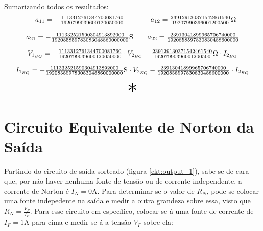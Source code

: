 \documentclass{report}
\let\oldsection\section
\renewcommand\section{\clearpage\oldsection}
\begin{document}
Sumarizando todos os resultados:
\begin{equation}
  \label{eq:params_a_calc}
  \centering
  \begin{matrix}
    a_{11} = - \frac{1113312761344700081760}{1920799039600120050000} & \hspace{10pt} a_{12} = \frac{239129130371542461540}{19207990396001200500} \Omega \\\\
    a_{21} = - \frac{111332521590304913892000}{192085859783083048860000000} \text{S} & \hspace{10pt} a_{22} = \frac{23913041899965706740000}{1920858597830830488600000}
  \end{matrix}
\end{equation}

\begin{equation}
  \label{eq:quad_params_a_calc}
  \centering
  \begin{matrix}
    V_{1_{EQ}} = - \frac{1113312761344700081760}{1920799039600120050000} \cdot V_{2_{EQ}} - \frac{239129130371542461540}{19207990396001200500} \Omega \cdot I_{2_{EQ}} \\\\
    I_{1_{EQ}} = - \frac{111332521590304913892000}{192085859783083048860000000} \text{S} \cdot V_{2_{EQ}} - \frac{23913041899965706740000}{1920858597830830488600000} \cdot I_{2_{EQ}}
  \end{matrix}
\end{equation}

\begin{center}
  \[ \scalebox{3}{$ * $} \]
\end{center}

\section{Circuito Equivalente de Norton da Saída}

Partindo do circuito de saída sorteado (figura \ref{ckt:output_1}), sabe-se de cara que, por não haver nenhuma fonte de tensão ou de corrente independente,
a corrente de Norton é $ I_N = 0 \text{A} $. Para determinar-se o valor de $ R_N $, pode-se colocar uma fonte indepedente na saída e medir a outra grandeza
sobre essa, visto que $ R_N = \frac{V_F}{I_F} $. Para esse circuito em específico, colocar-se-á uma fonte de corrente de $ I_F = 1\text{A} $ para cima e medir-se-á
a tensão $ V_F $ sobre ela:
\end{document}
